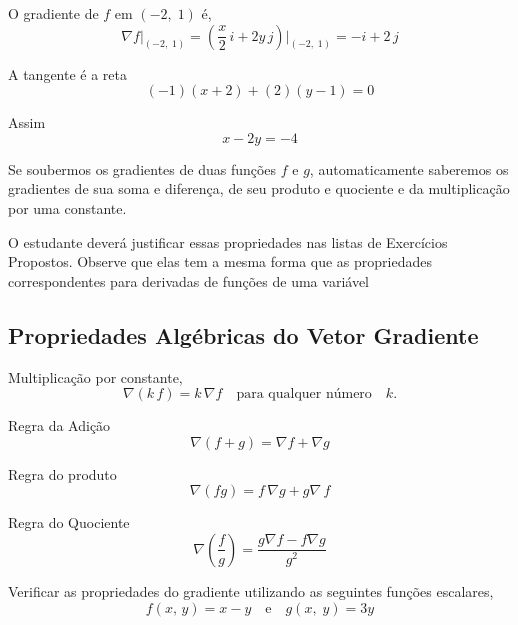 O gradiente de \(f\) em \((-2,\;  1)\)  é,
\begin{equation*}
	\nabla f\Big\vert_{(-2,\; 1)}=\left(\frac{x}{2}\, i + 2y\, j \right)\Bigg\vert_{(-2,\; 1)}= -i+2\, j
\end{equation*}

A tangente é a reta
\begin{equation*}
	(-1)(x+2)+(2)(y-1)=0
\end{equation*}

Assim
\begin{equation*}
	x-2y = -4
\end{equation*}

Se soubermos os gradientes de duas funções \(f\) e \(g\), automaticamente saberemos os gradientes de sua soma e diferença, de seu produto e quociente e da multiplicação por uma constante.

O estudante deverá justificar essas propriedades nas listas de Exercícios Propostos. Observe que elas tem a mesma forma que as propriedades correspondentes para derivadas de funções de uma variável

%
\subsection{Propriedades Algébricas do Vetor Gradiente}
%
Multiplicação por constante,
\begin{equation*}
	\nabla ( k\, f ) = k\, \nabla f \quad \text{para qualquer número}\quad  k.
\end{equation*}

Regra da Adição
\begin{equation*}
	\nabla( f+g) = \nabla f + \nabla g
\end{equation*}

Regra do produto
\begin{equation*}
	\nabla (fg) = f\, \nabla g + g\nabla\, f
\end{equation*}

Regra do Quociente
\begin{equation*}
	\nabla \left(\frac{f}{g} \right) = \frac{g\nabla f - f \nabla g}{g^{2}}
\end{equation*}

\bigskip
\begin{exc}
	Verificar as propriedades do gradiente utilizando as seguintes funções escalares,
	\begin{equation*}
		f(x,\, y)=x-y \quad \text{e} \quad g(x,\; y)=3y
	\end{equation*}
\end{exc}

